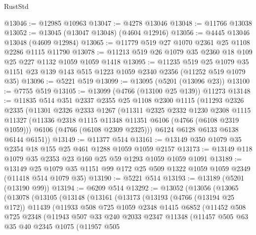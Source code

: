\begin{lexlean}{RustStd}
\begin{coremodule}
@13046 := @12985 @10963
@13047 := @4278 @13046
@13048 := @11766 @13038
@13052 := @13045 (@13047 @13048) (@4604 @12916)
@13056 := @4445 @13046 @13048 (@4609 @12984)
@13065 := @11779 @519 @27 @1070 @2361 @25 @1108 @2286 @1115 @11790
@13078 := @11213 @519 @26 @1079 @35 @2360 @18 @109 @25 @227 @1132 @1059 @1059 @1418
@13095 := @11235
    @519
    @25
    @1079
    @35
    @1151
    @23
    @139
    @143
    @515
    @1223
    @1059
    @2340
    @2356
    (@11252 @519 @1079 @35)
@13096 := @5221 @519
@13099 := @13095 (@5201 (@13096 @23))
@13100 := @7755 @519
@13105 := @13099 (@4766 (@13100 @25 @139)) @11273
@13148 := @11835
    @514
    @351
    @2337
    @2355
    @25
    @1108
    @2300
    @1115
    (@11293
      @2326
      @2335
      (@11301
        @2326
        @2333
        @1267
        (@11311
          @2325
          @2332
          @1230
          @2308
          @1115
          @11327
          (@11336 @2318 @1115 @11348 @11351 @6106 (@4766 (@6108 @2319 @1059)))
          @6106
          (@4766 (@6108 @2309 @2325)))
        @6124
        @6128
        @6133
        @6138
        @6144
        @6151))
@13149 := @11377 @514
@13161 := @13149 @350 @1079 @35 @2354 @18 @155 @25 @461 @1288 @1059 @1059 @2157
@13173 := @13149 @118 @1079 @35 @2353 @23 @160 @25 @59 @1293 @1059 @1059 @1091
@13189 := @13149
    @25
    @1079
    @35
    @1151
    @99
    @172
    @25
    @509
    @1322
    @1059
    @1059
    @2349
    (@11418 @514 @1079 @35)
@13190 := @5221 @514
@13193 := @13189 (@5201 (@13190 @99))
@13194 := @6209 @514
@13292 := @13052
    (@13056
      (@13065
        (@13078
          (@13105
            (@13148
              (@13161
                (@13173
                  (@13193
                    (@4766 (@13194 @25 @172))
                    @11439
                    (@11933
                      @508
                      @725
                      @1059
                      @2348
                      @1415
                      @6852
                      (@11452
                        @508
                        @725
                        @2348
                        (@11943
                          @507
                          @33
                          @240
                          @2033
                          @2347
                          @11348
                          (@11457
                            @505
                            @63
                            @35
                            @40
                            @2345
                            @1075
                            (@11957
                              @505

\end{coremodule}
\end{lexlean}
